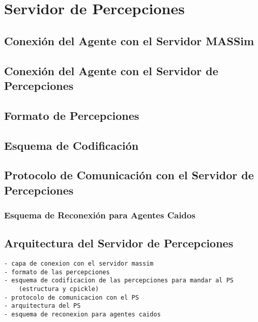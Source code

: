
\chapter{Servidor de Percepciones}
\label{chap:servidor_de_percepciones}

\section{Conexión del Agente con el Servidor MASSim}

\section{Conexión del Agente con el Servidor de Percepciones}

\section{Formato de Percepciones}

\section{Esquema de Codificación}

\section{Protocolo de Comunicación con el Servidor de Percepciones}

\subsection{Esquema de Reconexión para Agentes Caidos}

\section{Arquitectura del Servidor de Percepciones}

\begin{verbatim}
- capa de conexion con el servidor massim
- formato de las percepciones
- esquema de codificacion de las percepciones para mandar al PS
    (estructura y cpickle) 
- protocolo de comunicacion con el PS
- arquitectura del PS
- esquema de reconexion para agentes caidos
\end{verbatim}